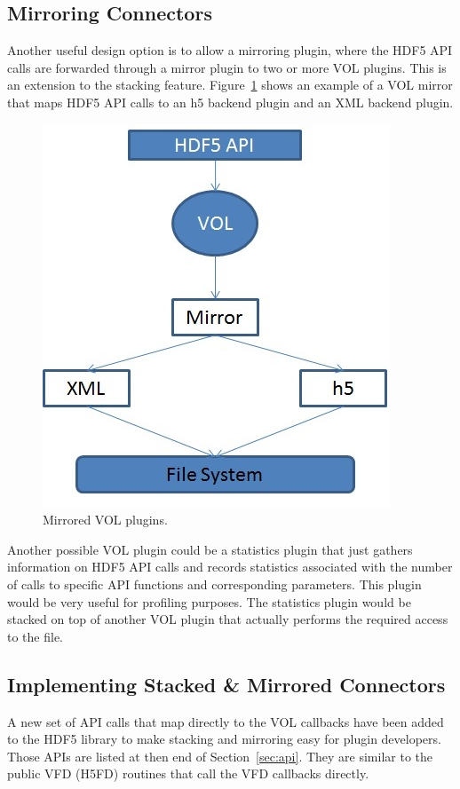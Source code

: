 \subsection{Mirroring Connectors}
Another useful design option is to allow a mirroring plugin, where the
HDF5 API calls are forwarded through a mirror plugin to two or more
VOL plugins. This is an extension to the stacking
feature. Figure~\ref{fig:mirror} shows an example of a VOL mirror that
maps HDF5 API calls to an h5 backend plugin and an XML backend plugin.

\begin{figure}[ht!]
\centering
\includegraphics[scale=0.75]{mirrored.jpg}
\caption{Mirrored VOL plugins.}
\label{fig:mirror}
\end{figure}

Another possible VOL plugin could be a statistics plugin that just
gathers information on HDF5 API calls and records statistics
associated with the number of calls to specific API functions and
corresponding parameters. This plugin would be very useful for
profiling purposes. The statistics plugin would be stacked on top of
another VOL plugin that actually performs the required access to the
file.

\subsection{Implementing Stacked \& Mirrored Connectors}
A new set of API calls that map directly to the VOL callbacks have
been added to the HDF5 library to make stacking and mirroring easy for
plugin developers. Those APIs are listed at then end of Section~\ref{sec:api}. They are similar to the public VFD (H5FD) routines that call the VFD callbacks directly.

